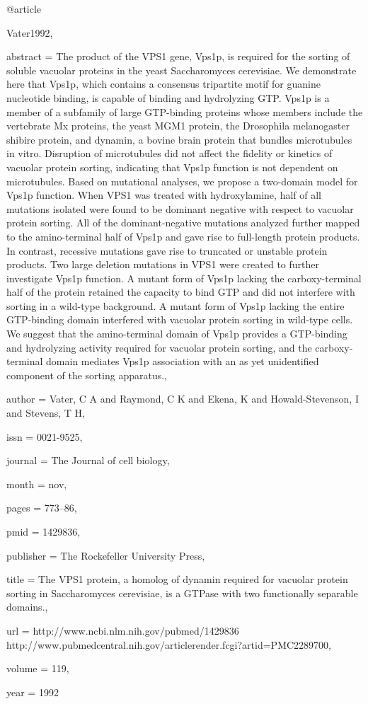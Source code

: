 @article{Vater1992,

abstract = {The product of the VPS1 gene, Vps1p, is required for the sorting of soluble vacuolar proteins in the yeast Saccharomyces cerevisiae. We demonstrate here that Vps1p, which contains a consensus tripartite motif for guanine nucleotide binding, is capable of binding and hydrolyzing GTP. Vps1p is a member of a subfamily of large GTP-binding proteins whose members include the vertebrate Mx proteins, the yeast MGM1 protein, the Drosophila melanogaster shibire protein, and dynamin, a bovine brain protein that bundles microtubules in vitro. Disruption of microtubules did not affect the fidelity or kinetics of vacuolar protein sorting, indicating that Vps1p function is not dependent on microtubules. Based on mutational analyses, we propose a two-domain model for Vps1p function. When VPS1 was treated with hydroxylamine, half of all mutations isolated were found to be dominant negative with respect to vacuolar protein sorting. All of the dominant-negative mutations analyzed further mapped to the amino-terminal half of Vps1p and gave rise to full-length protein products. In contrast, recessive mutations gave rise to truncated or unstable protein products. Two large deletion mutations in VPS1 were created to further investigate Vps1p function. A mutant form of Vps1p lacking the carboxy-terminal half of the protein retained the capacity to bind GTP and did not interfere with sorting in a wild-type background. A mutant form of Vps1p lacking the entire GTP-binding domain interfered with vacuolar protein sorting in wild-type cells. We suggest that the amino-terminal domain of Vps1p provides a GTP-binding and hydrolyzing activity required for vacuolar protein sorting, and the carboxy-terminal domain mediates Vps1p association with an as yet unidentified component of the sorting apparatus.},

author = {Vater, C A and Raymond, C K and Ekena, K and Howald-Stevenson, I and Stevens, T H},

issn = {0021-9525},

journal = {The Journal of cell biology},

month = {nov},

pages = {773--86},

pmid = {1429836},

publisher = {The Rockefeller University Press},

title = {{The VPS1 protein, a homolog of dynamin required for vacuolar protein sorting in Saccharomyces cerevisiae, is a GTPase with two functionally separable domains.}},

url = {http://www.ncbi.nlm.nih.gov/pubmed/1429836 http://www.pubmedcentral.nih.gov/articlerender.fcgi?artid=PMC2289700},

volume = {119},

year = {1992}

}

